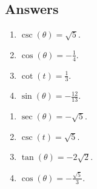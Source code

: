 \subsection{Answers}

\begin{multicols}{4}

\begin{enumerate}

\item   $\csc(\theta) = \sqrt{5}$. 

\item  $\cos(\theta) = -\frac{1}{4}$.  

\item   $\cot(t) = \frac{1}{3}$.  

\item $\sin(\theta) = -\frac{12}{13}$.  


\setcounter{HW}{\value{enumi}}

\end{enumerate}

\end{multicols}

\begin{multicols}{4}

\begin{enumerate}
\setcounter{enumi}{\value{HW}}

\item $\sec(\theta) = -\sqrt{5}$.  

\item  $\csc(t) = \sqrt{5}$.  

\item  $\tan(\theta) = -2\sqrt{2}$.  

\item $\cos(\theta) = -\frac{\sqrt{5}}{3}$.

\setcounter{HW}{\value{enumi}}

\end{enumerate}

\end{multicols}

